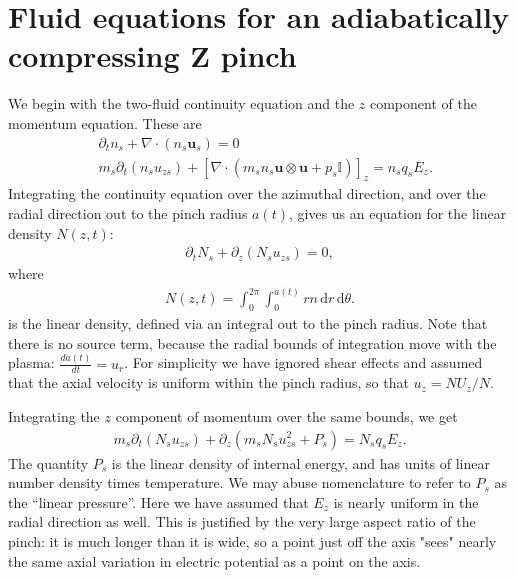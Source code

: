 \documentclass{article}
\begin{document}
\section{Fluid equations for an adiabatically compressing Z pinch}


We begin with the two-fluid continuity equation and the $z$ component of the momentum equation.
These are
\begin{align*}
&\partial_t n_s + \nabla \cdot (n_s \bm{u}_s) = 0 \\
&m_s \partial_t (n_s u_{zs}) + \left[ \nabla \cdot (m_s n_s \bm{u} \otimes \bm{u} + p_s \mathbb{I}) \right]_z = n_s q_s E_z.
\end{align*}
Integrating the continuity equation over the azimuthal direction, and over the radial direction out to the pinch radius $a(t)$,
gives us an equation for the linear density $N(z, t)$:
\begin{align*}
    \partial_t N_s + \partial_z (N_s u_{zs}) = 0,
\end{align*}
where
\begin{align*}
    N(z, t) = \int_0^{2\pi} \int_0^{a(t)} r n \, \mathrm{d} r \, \mathrm{d} \theta.
\end{align*}
is the linear density, defined via an integral out to the pinch radius.
Note that there is no source term, because the radial bounds of integration move with the plasma: $\frac{d a(t)}{dt} = u_r$.
For simplicity we have ignored shear effects and assumed that the axial velocity is uniform within the pinch radius,
so that $u_z = NU_z / N$.

Integrating the $z$ component of momentum over the same bounds, we get
\begin{align*}
    m_s \partial_t (N_s u_{zs}) + \partial_z \left( m_s N_s u_{zs}^2 + P_s \right) = N_s q_s E_z.
\end{align*}
The quantity $P_s$ is the linear density of internal energy, and has units of linear number density times temperature.
We may abuse nomenclature to refer to $P_s$ as the ``linear pressure''.
Here we have assumed that $E_z$ is nearly uniform in the radial direction as well.
This is justified by the very large aspect ratio of the pinch: it is much longer than
it is wide, so a point just off the axis "sees" nearly the same axial variation in electric potential
as a point on the axis.
\end{document}

